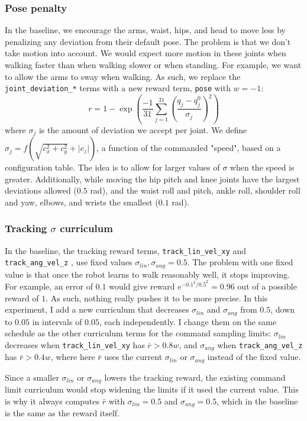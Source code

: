 \documentclass[11pt]{article}
\newcommand{\code}[1]{%
    \colorbox{mdBg}{\textcolor{mdText}{\texttt{#1}}}%
}
\begin{document}
\subsubsection{Pose penalty}
In the baseline, we encourage the arms, waist, hips, and head to move less by penalizing any deviation from their default pose. The problem is that we don't take motion into account. We would expect more motion in these joints when walking faster than when walking slower or when standing. For example, we want to allow the arms to sway when walking. As such, we replace the \code{joint\_deviation\_*} terms with a new reward term, \code{pose} with $w=-1$:
\[
r=1-\exp (\frac{-1}{31} \sum_{j=1}^{31}(\frac{q_j-q_j^0}{\sigma_j})^2)
\]
where $\sigma_j$ is the amount of deviation we accept per joint. We define $\sigma_j = f(\sqrt{c_x^2 + c_y^2} + |c_z|)$, a function of the commanded "speed", based on a configuration table. The idea is to allow for larger values of $\sigma$ when the speed is greater. Additionally, while moving the hip pitch and knee joints have the largest deviations allowed ($0.5$ rad), and the waist roll and pitch, ankle roll, shoulder roll and yaw, elbows, and wrists the smallest ($0.1$ rad).
\subsubsection{Tracking $\sigma$ curriculum}
In the baseline, the tracking reward terms, \code{track\_lin\_vel\_xy} and \code{track\_ang\_vel\_z}, use fixed values $\sigma_{lin},\sigma_{ang}=0.5$. The problem with one fixed value is that once the robot learns to walk reasonably well, it stops improving. For example, an error of $0.1$ would give reward $e^{-0.1^2 / 0.5^2}=0.96$ out of a possible reward of $1$. As such, nothing really pushes it to be more precise. In this experiment, I add a new curriculum that decreases $\sigma_{lin}$ and $\sigma_{ang}$ from $0.5$, down to $0.05$ in intervals of $0.05$, each independently. I change them on the same schedule as the other curriculum terms for the command sampling limits: $\sigma_{lin}$ decreases when \code{track\_lin\_vel\_xy} has $\bar r > 0.8w$, and $\sigma_{ang}$ when \code{track\_ang\_vel\_z} has $\bar r > 0.4w$, where here $\bar r$ uses the current $\sigma_{lin}$ or $\sigma_{ang}$ instead of the fixed value.

Since a smaller $\sigma_{lin}$ or $\sigma_{ang}$ lowers the tracking reward, the existing command limit curriculum would stop widening the limits if it used the current value. This is why it always computes $\bar r$ with $\sigma_{lin}=0.5$ and $\sigma_{ang}=0.5$, which in the baseline is the same as the reward itself.
\end{document}

